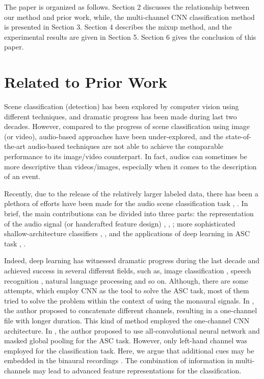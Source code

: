 \documentclass[conference]{IEEEtran}
\begin{document}
The paper is organized as follows. Section 2 discusses the relationship between our method and prior work, while, the multi-channel CNN classification method is presented in Section 3. Section 4 describes the mixup method, and the experimental results are given in Section 5. Section 6 gives the conclusion of this paper.

\section{Related to Prior Work}

Scene classification (detection) has been explored by computer vision using different techniques, and dramatic progress has been made during last two decades. However, compared to the progress of scene classification using image (or video), audio-based approaches have been under-explored, and the state-of-the-art audio-based techniques are not able to achieve the comparable performance to its image/video counterpart. In fact, audios can sometimes be more descriptive than videos/images, especially when it comes to the description of an event.

Recently, due to the release of the relatively larger labeled data, there has been a plethora of efforts have been made for the audio scene classification task \cite{b7}, \cite{b8}. In brief, the main contributions can be divided into three parts: the representation of the audio signal (or handcrafted feature design) \cite{b9},  \cite{b10}, \cite{b11}; more sophisticated shallow-architecture classifiers \cite{b12}, \cite{b13}, \cite{b14} and the applications of deep learning in ASC task \cite{b15}, \cite{b16}.

Indeed, deep learning has witnessed dramatic progress during the last decade and achieved success in several different fields, such as, image classification \cite{b16}, speech recognition \cite{b17}, natural language processing \cite{b18} and so on. Although, there are some attempts, which employ CNN as the tool to solve the ASC task, most of them tried to solve the problem within the context of using the monaural signals. In \cite{b11}, the author proposed to concatenate different channels, resulting in a one-channel file with longer duration. This kind of method employed the one-channel CNN architecture. In \cite{b20}, the author proposed to use all-convolutional neural network and masked global pooling for the ASC task. However, only left-hand channel was employed for the classification task. Here, we argue that additional cues may be embedded in the binaural recordings \cite{b11}. The combination of information in multi-channels may lead to advanced feature representations for the classification.
\end{document}
